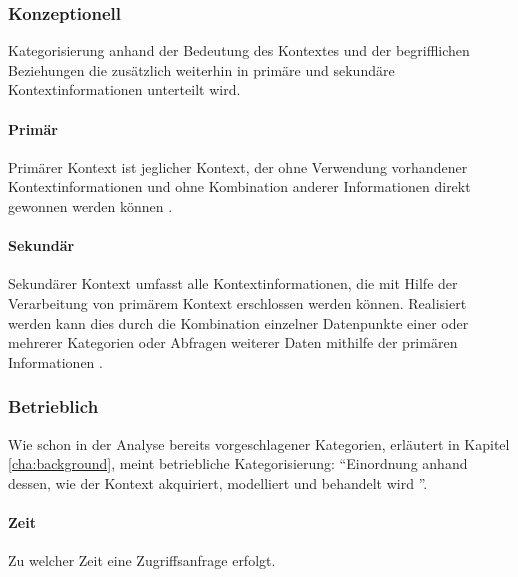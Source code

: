 \subsubsection{Konzeptionell}
Kategorisierung anhand der Bedeutung des Kontextes und der begrifflichen Beziehungen die zusätzlich weiterhin in primäre und sekundäre Kontextinformationen unterteilt wird.
\paragraph{Primär}
Primärer Kontext ist jeglicher Kontext, der ohne Verwendung vorhandener Kontextinformationen und ohne Kombination anderer Informationen direkt gewonnen werden können \cite{abowd_towards_1999}. 
\paragraph{Sekundär}
Sekundärer Kontext umfasst alle Kontextinformationen, die mit Hilfe der Verarbeitung von primärem Kontext erschlossen werden können. Realisiert werden kann dies durch die Kombination einzelner Datenpunkte einer oder mehrerer Kategorien oder Abfragen weiterer Daten mithilfe der primären Informationen  \cite{abowd_towards_1999}.
\subsubsection{Betrieblich}
Wie schon in der Analyse bereits vorgeschlagener Kategorien, erläutert in Kapitel \ref{cha:background}, meint betriebliche Kategorisierung: ``Einordnung anhand dessen, wie der Kontext akquiriert, modelliert und behandelt wird ''\cite{van2005context}.
\paragraph{Zeit}
Zu welcher Zeit eine Zugriffsanfrage erfolgt.
